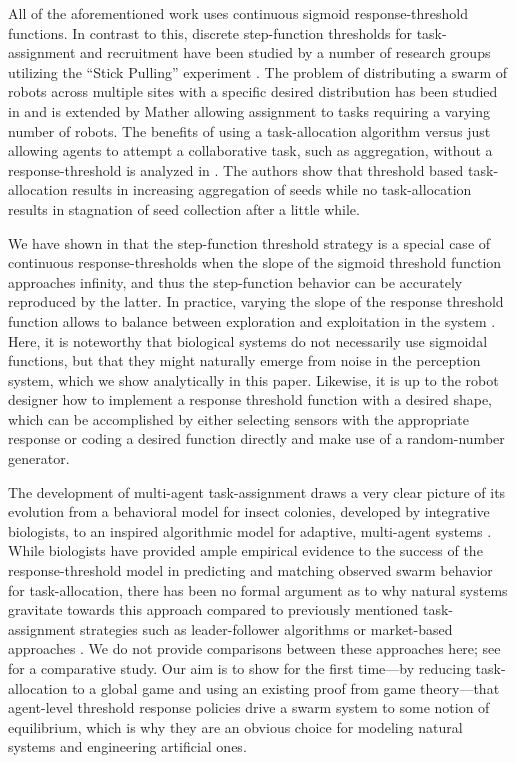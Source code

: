 \documentclass[conference]{ieeeconf}
\begin{document}
All of the aforementioned work uses continuous sigmoid response-threshold functions. In contrast to this, discrete step-function thresholds for task-assignment and recruitment have been studied by a number of research groups utilizing the ``Stick Pulling'' experiment \cite{Martinoli1995, Martinoli1998, Lerman2001, Martinoli2004}. The problem of distributing a swarm of robots across multiple sites with a specific desired distribution has been studied in \cite{Berman2009, Correll2008} and is extended by Mather \cite{Mather2010} allowing assignment to tasks requiring a varying number of robots. The benefits of using a task-allocation algorithm versus just allowing agents to attempt a collaborative task, such as aggregation, without a response-threshold is analyzed in \cite{Agassounon2001}. The authors show that threshold based task-allocation results in increasing aggregation of seeds while no task-allocation results in stagnation of seed collection after a little while. 

We have shown in \cite{Kanakia2014} that the step-function threshold strategy is a special case of continuous response-thresholds when the slope of the sigmoid threshold function approaches infinity, and thus the step-function behavior can be accurately reproduced by the latter. In practice, varying the slope of the response threshold function allows to balance between exploration and exploitation in the system \cite{Bonabeau1997}. Here, it is noteworthy that biological systems do not necessarily use sigmoidal functions, but that they might naturally emerge from noise in the perception system, which we show analytically in this paper. Likewise, it is up to the robot designer how to implement a response threshold function with a desired shape, which can be accomplished by either selecting sensors with the appropriate response or coding a desired function directly and make use of a random-number generator. 

The development of multi-agent task-assignment draws a very clear picture of its evolution from a behavioral model for insect colonies, developed by integrative biologists, to an inspired algorithmic model for adaptive, multi-agent systems \cite{Krieger2000}. While biologists have provided ample empirical evidence to the success of the response-threshold model in predicting and matching observed swarm behavior for task-allocation, there has been no formal argument as to why natural systems gravitate towards this approach compared to previously mentioned task-assignment strategies such as leader-follower algorithms \cite{Chen2011} or market-based approaches \cite{Amstutz2008,Vig2007}. We do not provide comparisons between these approaches here; see \cite{Kalra2006} for a comparative study. Our aim is to show for the first time---by reducing task-allocation to a global game and using an existing proof from game theory\cite{Carlsson1993}---that agent-level threshold response policies drive a swarm system to some notion of equilibrium, which is why they are an obvious choice for modeling natural systems and engineering artificial ones.
\end{document}
